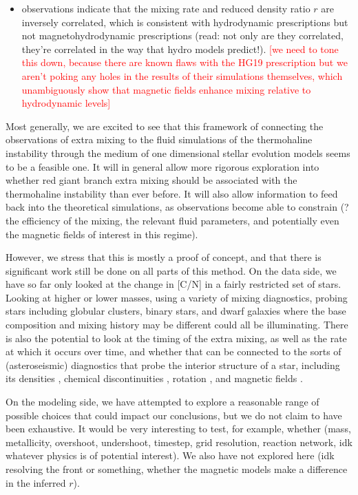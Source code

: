 \begin{itemize}
    \item observations indicate that the mixing rate and reduced density ratio $r$ are inversely correlated, which is consistent with hydrodynamic prescriptions but not magnetohydrodynamic prescriptions (read: not only are they correlated, they're correlated in the way that hydro models predict!). \textcolor{red}{[we need to tone this down, because there are known flaws with the HG19 prescription but we aren't poking any holes in the results of their simulations themselves, which unambiguously show that magnetic fields enhance mixing relative to hydrodynamic levels]}
    
    \end{itemize}

Most generally, we are excited to see that this framework of connecting the observations of extra mixing to the fluid simulations of the thermohaline instability through the medium of one dimensional stellar evolution models seems to be a feasible one. It will in general allow more rigorous exploration into whether red giant branch extra mixing should be associated with the thermohaline instability than ever before. It will also allow information to feed back into the theoretical simulations, as observations become able to constrain (? the efficiency of the mixing, the relevant fluid parameters, and potentially even the magnetic fields of interest in this regime). 

However, we stress that this is mostly a proof of concept, and that there is significant work still be done on all parts of this method. On the data side, we have so far only looked at the change in [C/N] in a fairly restricted set of stars. Looking at higher or lower masses, using a variety of mixing diagnostics, probing stars including globular clusters, binary stars, and dwarf galaxies where the base composition and mixing history may be different could all be illuminating. There is also the potential to look at the timing of the extra mixing, as well as the rate at which it occurs over time, and whether that can be connected to the sorts of (asteroseismic) diagnostics that probe the interior structure of a star, including its densities \citep{KjeldsenBedding1995}, chemical discontinuities \citep{Verma2017}, rotation \citep{Gehan2018}, and magnetic fields \citep{Bugnet2021}. 

On the modeling side, we have attempted to explore a reasonable range of possible choices that could impact our conclusions, but we do not claim to have been exhaustive. It would be very interesting to test, for example, whether
(mass, metallicity, overshoot, undershoot, timestep, grid resolution, reaction network, idk whatever physics is of potential interest). We also have not explored here (idk resolving the front or something, whether the magnetic models make a difference in the inferred $r$).

